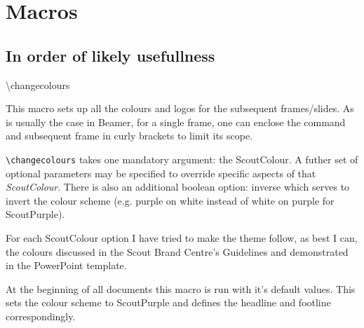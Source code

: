 \section*{Macros}
\subsection{In order of likely usefullness}
\begin{frame}{\textbackslash{}changecolours}
\scriptsize
\parbox{\textwidth}{This macro sets up all the colours and logos for the subsequent frames/slides. As is usually the case in Beamer, for a single frame, one can enclose the command and subsequent frame in curly brackets to limit its scope.}

\parbox{\textwidth}{{\tt \textbackslash{}changecolours} takes one mandatory argument: the \alert{ScoutColour}. A futher set of optional parameters may be specified to override specific aspects of that \emph{ScoutColour}. There is also an additional boolean option: \alert{inverse} which serves to invert the colour scheme (e.g. purple on white instead of white on purple for ScoutPurple).}

\parbox{\textwidth}{For each ScoutColour option I have tried to make the theme follow, as best I can, the colours discussed in the Scout Brand Centre's Guidelines and demonstrated in the PowerPoint template.}

\parbox{\textwidth}{At the beginning of all documents this macro is run with it's default values. This sets the colour scheme to \alert{ScoutPurple} and defines the headline and footline correspondingly.}
\end{frame}


